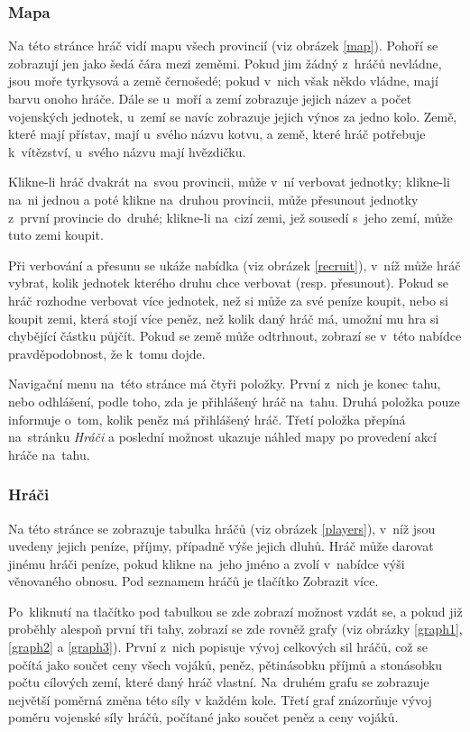 \documentclass[a4paper,12pt]{article}
\begin{document}
\subsubsection{Mapa}
Na této stránce hráč vidí mapu všech provincií (viz obrázek \ref{map}). Pohoří se zobrazují jen jako šedá čára mezi zeměmi. Pokud jim žádný z~hráčů nevládne, jsou moře tyrkysová a země černošedé; pokud v~nich však někdo vládne, mají barvu onoho hráče. Dále se u~moří a zemí zobrazuje jejich název a počet vojenských jednotek, u~zemí se navíc zobrazuje jejich výnos za jedno kolo. Země, které mají přístav, mají u~svého názvu kotvu, a země, které hráč potřebuje k~vítězství, u~svého názvu mají hvězdičku.

Klikne-li hráč dvakrát na~svou provincii, může v~ní verbovat jednotky; klikne-li na~ni jednou a poté klikne na~druhou provincii, může přesunout jednotky z~první provincie do~druhé; klikne-li na~cizí zemi, jež sousedí s~jeho zemí, může tuto zemi koupit.

Při verbování a přesunu se ukáže nabídka (viz obrázek \ref{recruit}), v~níž může hráč vybrat, kolik jednotek kterého druhu chce verbovat (resp. přesunout). Pokud se hráč rozhodne verbovat více jednotek, než si může za své peníze koupit, nebo si koupit zemi, která stojí více peněz, než kolik daný hráč má, umožní mu hra si chybějící částku půjčít. Pokud se země může odtrhnout, zobrazí se v~této nabídce pravděpodobnost, že k~tomu dojde.

Navigační menu na~této stránce má čtyři položky. První z~nich je konec tahu, nebo odhlášení, podle toho, zda je přihlášený hráč na~tahu. Druhá položka pouze informuje o~tom, kolik peněz má přihlášený hráč. Třetí položka přepíná na~stránku \textit{Hráči} a poslední možnost ukazuje náhled mapy po provedení akcí hráče na~tahu.
\subsubsection{Hráči}
Na této stránce se zobrazuje tabulka hráčů (viz obrázek \ref{players}), v~níž jsou uvedeny jejich peníze, příjmy, případně výše jejich dluhů. Hráč může darovat jinému hráči peníze, pokud klikne na~jeho jméno a zvolí v~nabídce výši věnovaného obnosu. Pod seznamem hráčů je tlačítko Zobrazit více.

Po~kliknutí na tlačítko pod tabulkou se zde zobrazí možnost vzdát se, a pokud již proběhly alespoň první tři tahy, zobrazí se zde rovněž grafy (viz obrázky \ref{graph1}, \ref{graph2} a \ref{graph3}). První z~nich popisuje vývoj celkových sil hráčů, což se počítá jako součet ceny všech vojáků, peněz, pětinásobku příjmů a stonásobku počtu cílových zemí, které daný hráč vlastní. Na~druhém grafu se zobrazuje největší poměrná změna této síly v každém kole. Třetí graf znázorňuje vývoj poměru vojenské síly hráčů, počítané jako součet peněz a ceny vojáků.
\end{document}
